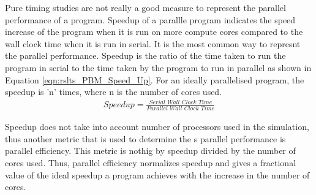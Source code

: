 \documentclass[preprint,11pt,authoryear]{elsarticle}
\begin{document}
Pure timing studies are not really a good measure to represent the parallel performance of a program. Speedup of a parallle program indicates the speed increase of the program when it is run on more compute cores compared to the wall clock time when it is run in serial. It is the most common way to represnt the parallel performance. Speedup is the ratio of the time taken to run the program in serial to the time taken by the program to run in parallel as shown in Equation \ref{eqn:rslts_PBM_Speed_Up}. For an ideally parallelised program, the speedup is 'n' times, where n is the number of cores used.\\

\begin{align}
\textit{Speedup} = \frac{\textit{Serial Wall Clock Time}}{\textit{Parallel Wall Clock Time}}
\label{eqn:rslts_PBM_Speed_Up}
\end{align}

Speedup does not take into account number of processors used in the simulation, thus another metric that is used to determine the s parallel performance is parallel efficiency. This metric is nothig by speedup divided by the number of cores used. Thus, parallel efficiency normalizes speedup and gives a fractional value of the ideal speedup a program achieves with the increase in the number of cores.\\
\end{document}
